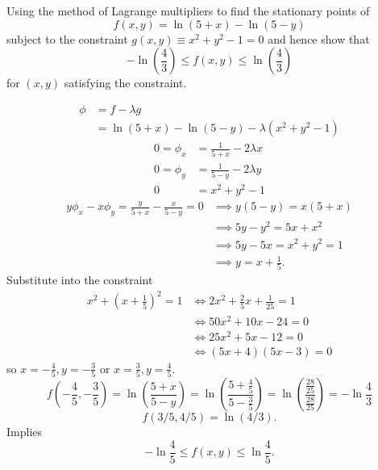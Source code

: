 \documentclass[10pt, a4paper]{article}
\begin{document}
\begin{problem}
    Using the method of Lagrange multipliers to find the stationary points of
    \[
    f(x, y) = \ln(5 + x) - \ln(5 - y)
    \]
    subject to the constraint $g(x, y) \equiv x ^ 2 + y ^ 2 - 1 = 0$ and hence show that
    \[
    -\ln\left(\frac{4}{3}\right) \leq f(x, y) \leq \ln\left(\frac{4}{3}\right)
    \]
    for $(x, y)$ satisfying the constraint.

    \begin{solution}
        \begin{align*}
            \phi &= f - \lambda g \\
            &= \ln(5 + x) - \ln(5 - y) - \lambda(x ^ 2 + y ^ 2 - 1)
        \end{align*}
        \begin{align*}
            0 = \phi_x &= \frac{1}{5 + x} - 2\lambda x \\
            0 = \phi_y &= \frac{1}{5 - y} - 2\lambda y \\
            0 &= x ^ 2 + y ^ 2 - 1
        \end{align*}
        \begin{align*}
            y\phi_x - x\phi_y = \frac{y}{5 + x} - \frac{x}{5 - y} = 0 &\implies y(5 - y) = x(5 + x) \\
            &\implies 5y - y ^ 2 = 5x + x ^ 2 \\
            &\implies 5y - 5x = x ^ 2 + y ^ 2 = 1 \\
            &\implies y = x + \frac{1}{5}.
        \end{align*}
        Substitute into the constraint
        \begin{align*}
            x ^ 2 + \left(x + \frac{1}{5}\right) ^ 2 = 1 &\iff 2x ^ 2 + \frac{2}{5}x + \frac{1}{25} = 1 \\
            &\iff 50x ^ 2 + 10x - 24 = 0 \\
            &\iff 25x ^ 2 + 5x - 12 = 0 \\
            &\iff (5x + 4)(5x - 3) = 0
        \end{align*}
        so $x = -\frac{4}{5}, y = -\frac{3}{5}$ or $x = \frac{3}{5}, y = \frac{4}{5}$.
        \[
        f\left(-\frac{4}{5}, -\frac{3}{5}\right) = \ln\left(\frac{5 + x}{5 - y}\right) = \ln\left(\frac{5 + \frac{4}{5}}{5 - \frac{3}{5}}\right) = \ln\left(\frac{\frac{28}{25}}{\frac{28}{25}}\right) = -\ln\frac{4}{3}
        \]
        \[
        f(3 / 5, 4 / 5) = \ln(4 / 3).
        \]
        Implies
        \[
        -\ln\frac{4}{5} \leq f(x, y) \leq \ln{\frac{4}{5}}.
        \]
    \end{solution}
\end{problem}
\end{document}
